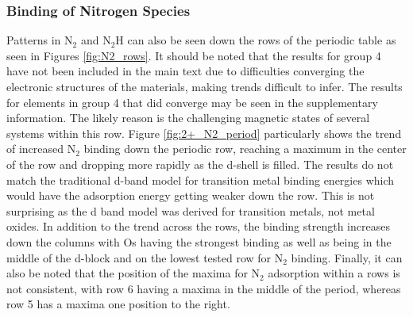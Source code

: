 \documentclass[catalysts,article,submit,moreauthors,pdftex,10pt,a4paper]{mdpi}
\theoremstyle{mdpi}
\newcounter{ex}
\newcounter{re}
\theoremstyle{mdpidefinition}
\begin{document}

\subsubsection{Binding of Nitrogen Species}

Patterns in N$_2$ and N$_2$H can also be seen down the rows of the periodic table as seen in Figures \ref{fig:N2_rows}. It should be noted that the results for group 4 have not been included in the main text due to difficulties converging the electronic structures of the materials, making trends difficult to infer. The results for elements in group 4 that did converge may be seen in the supplementary information. The likely reason is the challenging magnetic states of several systems within this row. Figure \ref{fig:2+_N2_period} particularly shows the trend of increased N$_2$ binding down the periodic row, reaching a maximum in the center of the row and dropping more rapidly as the d-shell is filled. The results do not match the traditional d-band model\cite{Nilsson_2008} for transition metal binding energies which would have the adsorption energy getting weaker down the row. This is not surprising as the d band model was derived for transition metals, not metal oxides. In addition to the trend across the rows, the binding strength increases down the columns with Os having the strongest binding as well as being in the middle of the d-block and on the lowest tested row for N$_2$ binding. Finally, it can also be noted that the position of the maxima for N$_2$ adsorption within a rows is not consistent, with row 6 having a maxima in the middle of the period, whereas row 5 has a maxima one position to the right.
\end{document}
